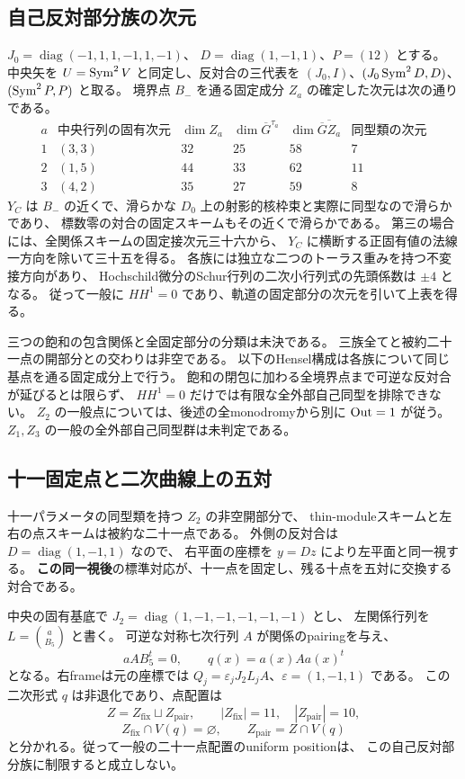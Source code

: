 \subsection{自己反対部分族の次元}
$J_0=\operatorname{diag}(-1,1,1,-1,1,-1)$、
$D=\operatorname{diag}(1,-1,1)$、$P=(12)$ とする。
中央矢を $U=\operatorname{Sym}^2V$ と同定し、反対合の三代表を
$(J_0,I)$、$(J_0\operatorname{Sym}^2D,D)$、$(\operatorname{Sym}^2P,P)$ と取る。
境界点 $B_-$ を通る固定成分 $Z_a$ の確定した次元は次の通りである。
\[
\begin{array}{c|c|c|c|c|c}
 a&\text{中央行列の固有次元}&\dim Z_a&
 \dim\overline G^{\tau_a}&\dim\overline{\overline GZ_a}&
 \text{同型類の次元}\\\hline
 1&(3,3)&32&25&58&7\\
 2&(1,5)&44&33&62&11\\
 3&(4,2)&35&27&59&8
\end{array}
\]
$Y_C$ は $B_-$ の近くで、滑らかな $D_0$ 上の射影的核枠束と実際に同型なので滑らかであり、
標数零の対合の固定スキームもその近くで滑らかである。
第三の場合には、全関係スキームの固定接次元三十六から、
$Y_C$ に横断する正固有値の法線一方向を除いて三十五を得る。
各族には独立な二つのトーラス重みを持つ不変接方向があり、
Hochschild微分のSchur行列の二次小行列式の先頭係数は $\pm4$ となる。
従って一般に $HH^1=0$ であり、軌道の固定部分の次元を引いて上表を得る。

三つの飽和の包含関係と全固定部分の分類は未決である。
三族全てと被約二十一点の開部分との交わりは非空である。
以下のHensel構成は各族について同じ基点を通る固定成分上で行う。
飽和の閉包に加わる全境界点まで可逆な反対合が延びるとは限らず、
$HH^1=0$ だけでは有限な全外部自己同型を排除できない。
$Z_2$ の一般点については、後述の全monodromyから別に $\operatorname{Out}=1$ が従う。
$Z_1,Z_3$ の一般の全外部自己同型群は未判定である。

\subsection{十一固定点と二次曲線上の五対}
十一パラメータの同型類を持つ $Z_2$ の非空開部分で、
thin-moduleスキームと左右の点スキームは被約な二十一点である。
外側の反対合は $D=\operatorname{diag}(1,-1,1)$ なので、
右平面の座標を $y=Dz$ により左平面と同一視する。
\textbf{この同一視後}の標準対応が、十一点を固定し、残る十点を五対に交換する対合である。

中央の固有基底で $J_2=\operatorname{diag}(1,-1,-1,-1,-1,-1)$ とし、
左関係行列を $L=\binom{a}{B_5}$ と書く。
可逆な対称七次行列 $A$ が関係のpairingを与え、
\[
 aAB_5^t=0,\qquad q(x)=a(x)A a(x)^t
\]
となる。右frameは元の座標では
$Q_j=\varepsilon_j J_2L_jA$、$\varepsilon=(1,-1,1)$ である。
この二次形式 $q$ は非退化であり、点配置は
\[
 Z=Z_{\mathrm{fix}}\sqcup Z_{\mathrm{pair}},\qquad
 |Z_{\mathrm{fix}}|=11,\quad |Z_{\mathrm{pair}}|=10,
\]
\[
 Z_{\mathrm{fix}}\cap V(q)=\varnothing,\qquad
 Z_{\mathrm{pair}}=Z\cap V(q)
\]
と分かれる。従って一般の二十一点配置のuniform positionは、
この自己反対部分族に制限すると成立しない。

